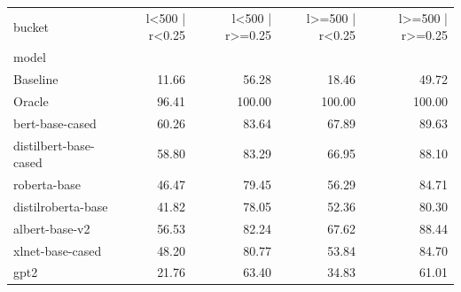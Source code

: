 \begin{tabular}{lrrrr}
\toprule
bucket & l<500 | r<0.25 & l<500 | r>=0.25 & l>=500 | r<0.25 & l>=500 | r>=0.25 \\
model &  &  &  &  \\
\midrule
Baseline & 11.66 & 56.28 & 18.46 & 49.72 \\
Oracle & 96.41 & 100.00 & 100.00 & 100.00 \\
bert-base-cased & 60.26 & 83.64 & 67.89 & 89.63 \\
distilbert-base-cased & 58.80 & 83.29 & 66.95 & 88.10 \\
roberta-base & 46.47 & 79.45 & 56.29 & 84.71 \\
distilroberta-base & 41.82 & 78.05 & 52.36 & 80.30 \\
albert-base-v2 & 56.53 & 82.24 & 67.62 & 88.44 \\
xlnet-base-cased & 48.20 & 80.77 & 53.84 & 84.70 \\
gpt2 & 21.76 & 63.40 & 34.83 & 61.01 \\
\bottomrule
\end{tabular}
